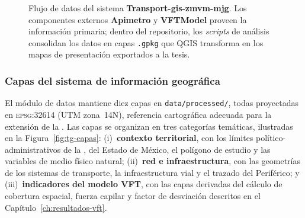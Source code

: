 \begin{figure}[htbp]
\caption[Pipeline de producción cartográfica de Transport-gis]%
  {Flujo de datos del sistema \textbf{Transport-gis-zmvm-mjg}. 
  Los componentes externos \textbf{Apimetro} y \textbf{VFTModel} proveen la información primaria; 
  dentro del repositorio, los \textit{scripts} de análisis consolidan los datos en capas \texttt{.gpkg} 
  que QGIS transforma en los mapas de presentación exportados a la tesis.}
\label{fig:tg-pipeline}
\end{figure}

\subsubsection{Capas del sistema de información geográfica}
\label{subsubsec:tg-capas}

El módulo de datos mantiene diez capas  en \texttt{data/processed/}, 
todas proyectadas en \textsc{epsg}:32614 (UTM zona~14N), referencia cartográfica adecuada 
para la extensión de la \zmvm{}. Las capas se organizan en tres categorías temáticas, ilustradas en la 
Figura~\ref{fig:tg-capas}: (i)~\textbf{contexto territorial}, con los límites político-administrativos de la \cdmx{}, del 
Estado de México, el polígono de estudio y las variables de medio físico natural; (ii)~\textbf{red e infraestructura}, 
con las geometrías de los sistemas de transporte, la infraestructura vial y el trazado del Periférico; y 
(iii)~\textbf{indicadores del modelo VFT}, con las capas derivadas del cálculo de cobertura espacial, 
fuerza capilar y factor de desviación descritos en el Capítulo~\ref{ch:resultados-vft}.

